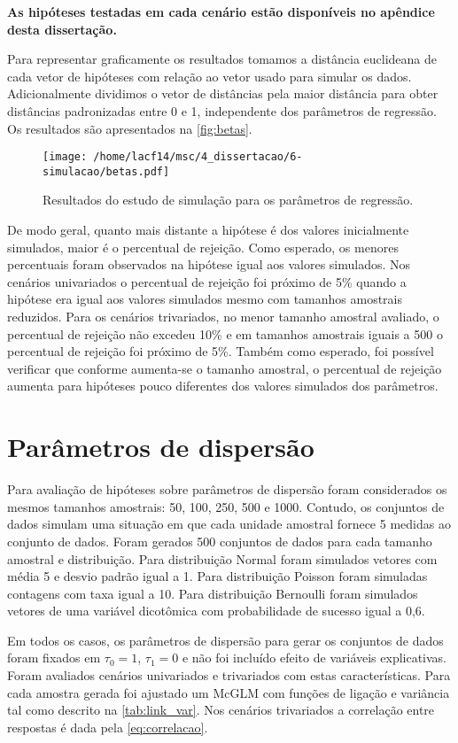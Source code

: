\textbf{As hipóteses testadas em cada cenário estão disponíveis no apêndice desta dissertação.}
 
Para representar graficamente os resultados tomamos a distância euclideana de cada vetor de hipóteses com relação ao vetor usado para simular os dados. Adicionalmente dividimos o vetor de distâncias pela maior distância para obter distâncias padronizadas entre 0 e 1, independente dos parâmetros de regressão. Os resultados são apresentados na \autoref{fig:betas}.

\begin{figure}[H]
\centering
\texttt{[image: /home/lacf14/msc/4\_dissertacao/6-simulacao/betas.pdf]}
\caption{Resultados do estudo de simulação para os parâmetros de regressão.}
\label{fig:betas}
\end{figure}

De modo geral, quanto mais distante a hipótese é dos valores inicialmente simulados, maior é o percentual de rejeição. Como esperado, os menores percentuais foram observados na hipótese igual aos valores simulados. Nos cenários univariados o percentual de rejeição foi próximo de 5\% quando a hipótese era igual aos valores simulados mesmo com tamanhos amostrais reduzidos. Para os cenários trivariados, no menor tamanho amostral avaliado, o percentual de rejeição não excedeu 10\% e em tamanhos amostrais iguais a 500 o percentual de rejeição foi próximo de 5\%. Também como esperado, foi possível verificar que conforme aumenta-se o tamanho amostral, o percentual de rejeição aumenta para hipóteses pouco diferentes dos valores simulados dos parâmetros.

\section{Parâmetros de dispersão}

Para avaliação de hipóteses sobre parâmetros de dispersão foram considerados os mesmos tamanhos amostrais: 50, 100, 250, 500 e 1000. Contudo, os conjuntos de dados simulam uma situação em que cada unidade amostral fornece 5 medidas ao conjunto de dados. Foram gerados 500 conjuntos de dados para cada tamanho amostral e distribuição. Para distribuição Normal foram simulados vetores com média 5 e desvio padrão igual a 1. Para distribuição Poisson foram simuladas contagens com taxa igual a 10. Para distribuição Bernoulli foram simulados vetores de uma variável dicotômica com probabilidade de sucesso igual a 0,6.

Em todos os casos, os parâmetros de dispersão para gerar os conjuntos de dados foram fixados em $\tau_0 = 1$, $\tau_1 = 0$ e não foi incluído efeito de variáveis explicativas. Foram avaliados cenários univariados e trivariados com estas características. Para cada amostra gerada foi ajustado um McGLM com funções de ligação e variância tal como descrito na \autoref{tab:link_var}. Nos cenários trivariados a correlação entre respostas é dada pela \autoref{eq:correlacao}.

